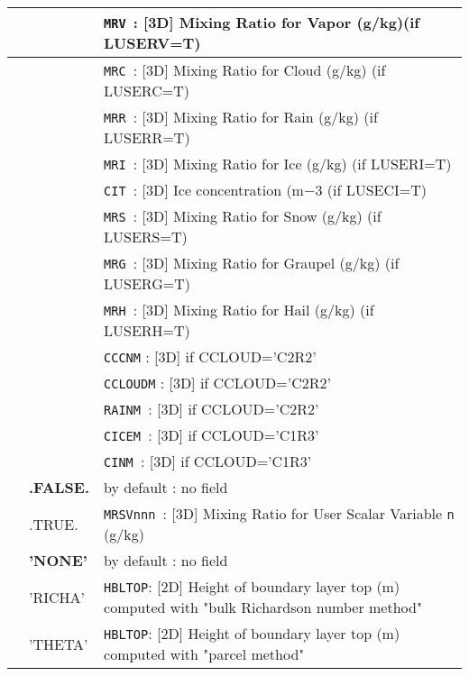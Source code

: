 \begin{center}
\begin{tabular}{|>{\centering}p{3cm}|>{\centering}p{2.5cm}|p{11cm}|}
&\multirow{9}{*}{.TRUE.} &{\tt MRV }: [3D] Mixing Ratio for Vapor (g/kg)(if LUSERV=T)\\\cline{3-3}
& &{\tt MRC }: [3D] Mixing Ratio for Cloud (g/kg) (if LUSERC=T)\\\cline{3-3}
& &{\tt MRR }: [3D] Mixing Ratio for Rain (g/kg) (if LUSERR=T)\\\cline{3-3}
& &{\tt MRI }: [3D] Mixing Ratio for Ice (g/kg) (if LUSERI=T)\\\cline{3-3}
& &{\tt CIT }: [3D] Ice concentration (m${-3}$ (if LUSECI=T)\\\cline{3-3}
& &{\tt MRS }: [3D] Mixing Ratio for Snow (g/kg) (if LUSERS=T)\\\cline{3-3}
& &{\tt MRG }: [3D] Mixing Ratio for Graupel (g/kg) (if LUSERG=T)\\\cline{3-3}
& &{\tt MRH }: [3D] Mixing Ratio for Hail (g/kg) (if LUSERH=T)\\\cline{3-3}
& &{\tt CCCNM} : [3D] if CCLOUD='C2R2' \\\cline{3-3}
& &{\tt CCLOUDM} : [3D] if CCLOUD='C2R2' \\\cline{3-3}
& &{\tt RAINM }: [3D] if CCLOUD='C2R2' \\\cline{3-3}
& &{\tt CICEM }: [3D] if CCLOUD='C1R3' \\\cline{3-3}
& &{\tt CINM }: [3D] if CCLOUD='C1R3' \\\hline
\hline
\multirow{2}{*}{LVAR\_MRSV}\index{LVAR\_MRSV!\innam{NAM\_DIAG}}&\textbf{.FALSE.} & by default : no field\\\cline{2-3}
&.TRUE. &{\tt MRSVnnn }: [3D] Mixing Ratio for User Scalar Variable {\tt n }(g/kg) \\ \hline
\multirow{3}{*}{CBLTOP}\index{CBLTOP!\innam{NAM\_DIAG}}&\textbf{'NONE'} & by default : no field \\\cline{2-3}
&'RICHA' &{\tt HBLTOP}: [2D] Height of boundary layer top (m) computed with "bulk Richardson number method"\\\cline{2-3}
&'THETA' &{\tt HBLTOP}: [2D] Height of boundary layer top (m) computed with "parcel method"\\\hline
\end{tabular}
\end{center}

